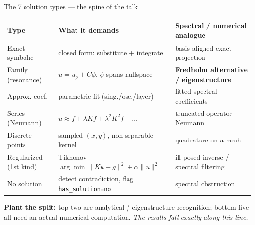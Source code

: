 \documentclass[10pt,aspectratio=169]{beamer}
\begin{document}
\begin{frame}{The 7 solution types --- the spine of the talk}
  \footnotesize
  \begin{center}
  \begin{tabular}{@{}lll@{}}
    \toprule
    \textbf{Type} & \textbf{What it demands} & \textbf{Spectral / numerical analogue} \\
    \midrule
    Exact symbolic   & closed form: substitute + integrate & basis-aligned exact projection \\
    Family (resonance) & $u = u_p + C\phi$, $\phi$ spans nullspace & \textbf{Fredholm alternative / eigenstructure} \\
    Approx. coef.    & parametric fit (sing./osc./layer)   & fitted spectral coefficients \\
    Series (Neumann) & $u\approx f+\lambda Kf+\lambda^2K^2f+\dots$ & truncated operator-Neumann \\
    Discrete points  & sampled $(x,y)$, non-separable kernel & quadrature on a mesh \\
    Regularized (1st kind) & Tikhonov $\arg\min\|Ku-g\|^2+\alpha\|u\|^2$ & ill-posed inverse / spectral filtering \\
    No solution      & detect contradiction, flag \texttt{has\_solution=no} & spectral obstruction \\
    \bottomrule
  \end{tabular}
  \end{center}
  \vspace{4pt}
  \textbf{Plant the split:} top two are analytical / eigenstructure recognition; bottom five all
  need an actual numerical computation. \emph{The results fall exactly along this line.}
\end{frame}
\end{document}
